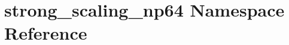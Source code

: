 \hypertarget{namespacestrong__scaling__np64}{}\section{strong\+\_\+scaling\+\_\+np64 Namespace Reference}
\label{namespacestrong__scaling__np64}
